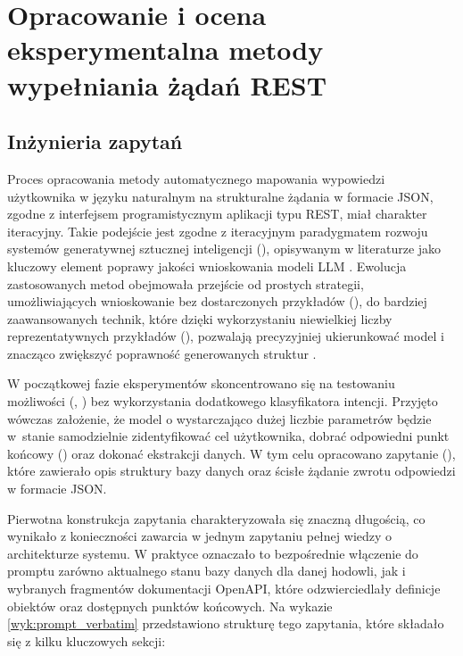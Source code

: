 \chapter{Opracowanie i ocena eksperymentalna metody wypełniania żądań REST}

\section{Inżynieria zapytań}

Proces opracowania metody automatycznego mapowania wypowiedzi użytkownika w języku naturalnym na strukturalne żądania w formacie JSON, zgodne z interfejsem programistycznym aplikacji typu REST, miał charakter iteracyjny. Takie podejście jest zgodne z iteracyjnym paradygmatem rozwoju systemów generatywnej sztucznej inteligencji (), opisywanym w literaturze jako kluczowy element poprawy jakości wnioskowania modeli LLM \cite{brown2020language,ouyang2022training}. Ewolucja zastosowanych metod obejmowała przejście od prostych strategii, umożliwiających wnioskowanie bez dostarczonych przykładów (), do bardziej zaawansowanych technik, które dzięki wykorzystaniu niewielkiej liczby reprezentatywnych przykładów (), pozwalają precyzyjniej ukierunkować model i znacząco zwiększyć poprawność generowanych struktur \cite{brown2020language,liu2023pre}.

W początkowej fazie eksperymentów skoncentrowano się na testowaniu możliwości  (, ) bez wykorzystania dodatkowego klasyfikatora intencji. Przyjęto wówczas założenie, że model o wystarczająco dużej liczbie parametrów będzie w~stanie samodzielnie zidentyfikować cel użytkownika, dobrać odpowiedni punkt końcowy () oraz dokonać ekstrakcji danych. W tym celu opracowano zapytanie (), które zawierało opis struktury bazy danych oraz ścisłe żądanie zwrotu odpowiedzi w formacie JSON.

Pierwotna konstrukcja zapytania charakteryzowała się znaczną długością, co wynikało z konieczności zawarcia w jednym zapytaniu pełnej wiedzy o architekturze systemu. W praktyce oznaczało to bezpośrednie włączenie do promptu zarówno aktualnego stanu bazy danych dla danej hodowli, jak i wybranych fragmentów dokumentacji OpenAPI, które odzwierciedlały definicje obiektów oraz dostępnych punktów końcowych. Na wykazie \ref{wyk:prompt_verbatim} przedstawiono strukturę tego zapytania, które składało się z kilku kluczowych sekcji:

